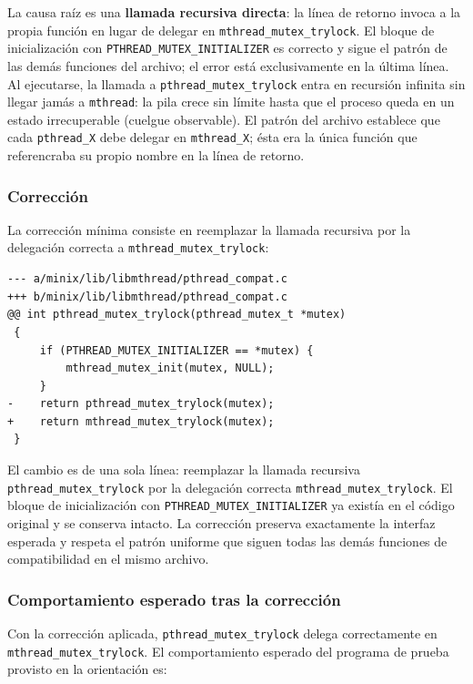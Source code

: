 \documentclass[11pt,a4paper]{article}
\begin{document}
La causa ra\'iz es una \textbf{llamada recursiva directa}: la l\'inea de retorno invoca a la propia funci\'on en lugar de delegar en \texttt{mthread\_mutex\_trylock}. El bloque de inicializaci\'on con \texttt{PTHREAD\_MUTEX\_INITIALIZER} es correcto y sigue el patr\'on de las dem\'as funciones del archivo; el error est\'a exclusivamente en la \'ultima l\'inea. Al ejecutarse, la llamada a \texttt{pthread\_mutex\_trylock} entra en recursi\'on infinita sin llegar jam\'as a \texttt{mthread}: la pila crece sin l\'imite hasta que el proceso queda en un estado irrecuperable (cuelgue observable). El patr\'on del archivo establece que cada \texttt{pthread\_X} debe delegar en \texttt{mthread\_X}; \'esta era la \'unica funci\'on que referencraba su propio nombre en la l\'inea de retorno.

\subsubsection*{Correcci\'on}

La correcci\'on m\'inima consiste en reemplazar la llamada recursiva por la delegaci\'on correcta a \texttt{mthread\_mutex\_trylock}:

\begin{lstlisting}[style=diffstyle,caption={Diff funcional de la correcci\'on en \texttt{pthread\_compat.c}}]
--- a/minix/lib/libmthread/pthread_compat.c
+++ b/minix/lib/libmthread/pthread_compat.c
@@ int pthread_mutex_trylock(pthread_mutex_t *mutex)
 {
     if (PTHREAD_MUTEX_INITIALIZER == *mutex) {
         mthread_mutex_init(mutex, NULL);
     }
-    return pthread_mutex_trylock(mutex);
+    return mthread_mutex_trylock(mutex);
 }
\end{lstlisting}

El cambio es de una sola l\'inea: reemplazar la llamada recursiva \texttt{pthread\_mutex\_trylock} por la delegaci\'on correcta \texttt{mthread\_mutex\_trylock}. El bloque de inicializaci\'on con \texttt{PTHREAD\_MUTEX\_INITIALIZER} ya exist\'ia en el c\'odigo original y se conserva intacto. La correcci\'on preserva exactamente la interfaz esperada y respeta el patr\'on uniforme que siguen todas las dem\'as funciones de compatibilidad en el mismo archivo.

\subsubsection*{Comportamiento esperado tras la correcci\'on}

Con la correcci\'on aplicada, \texttt{pthread\_mutex\_trylock} delega correctamente en \texttt{mthread\_mutex\_trylock}. El comportamiento esperado del programa de prueba provisto en la orientaci\'on es:
\end{document}
